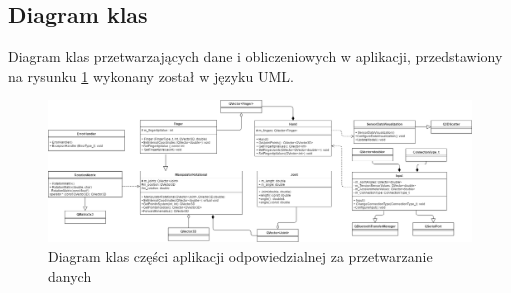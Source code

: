 \documentclass[10pt,a4paper]{article}
\begin{document}
\newpage
\subsection{Diagram klas}
Diagram klas przetwarzających dane i obliczeniowych w aplikacji, przedstawiony na rysunku \ref{fig:classdiagram} wykonany został w języku UML.\\
\begin{figure}[!htb]
\centering
\includegraphics[angle=90,height=0.8\textheight]{./ClassDiagram.png}
\caption{Diagram klas części aplikacji odpowiedzialnej za przetwarzanie danych\label{fig:classdiagram}}
\end{figure}
\newpage
\end{document}
